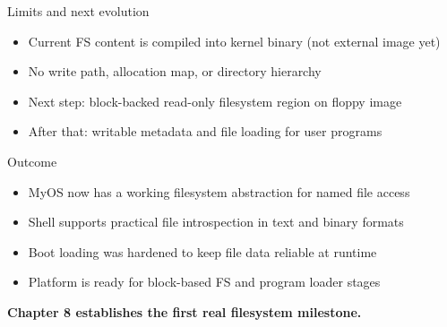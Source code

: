 \documentclass[aspectratio=169]{beamer}
\begin{document}
\begin{frame}{Limits and next evolution}
  \begin{itemize}
    \item Current FS content is compiled into kernel binary (not external image yet)
    \item No write path, allocation map, or directory hierarchy
    \item Next step: block-backed read-only filesystem region on floppy image
    \item After that: writable metadata and file loading for user programs
  \end{itemize}
\end{frame}

\begin{frame}{Outcome}
  \begin{itemize}
    \item MyOS now has a working filesystem abstraction for named file access
    \item Shell supports practical file introspection in text and binary formats
    \item Boot loading was hardened to keep file data reliable at runtime
    \item Platform is ready for block-based FS and program loader stages
  \end{itemize}
  \vspace{8pt}
  \begin{center}
    \Large \textbf{Chapter 8 establishes the first real filesystem milestone.}
  \end{center}
\end{frame}
\end{document}
